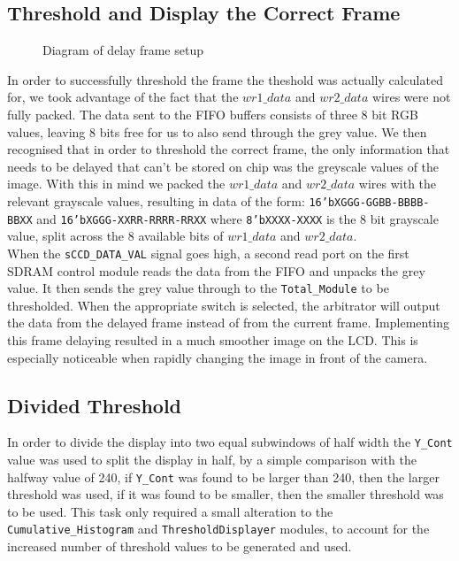 \documentclass[12pt]{article}
\begin{document}
  \subsection{Threshold and Display the Correct Frame}
    \begin{figure}[H]
    \caption{Diagram of delay frame setup}
    \label{fig:hdelyf_ram}
  \end{figure}
  
  In order to successfully threshold the frame the theshold was actually calculated for, we took advantage of the fact that the \(wr1\_data\) and \(wr2\_data\) wires were not fully packed. The data sent to the FIFO buffers consists of three 8 bit RGB values, leaving 8 bits free for us to also send through the grey value. We then recognised that in order to threshold the correct frame, the only information that needs to be delayed that can't be stored on chip was the greyscale values of the image. With this in mind we packed the \(wr1\_data\) and \(wr2\_data\) wires with the relevant grayscale values, resulting in data of the form: \texttt{16'bXGGG-GGBB-BBBB-BBXX} and \texttt{16'bXGGG-XXRR-RRRR-RRXX} where \texttt{8'bXXXX-XXXX} is the 8 bit grayscale value, split across the 8 available bits of \(wr1\_data\) and \(wr2\_data\).\\

  When the \texttt{sCCD\_DATA\_VAL} signal goes high, a second read port on the first SDRAM control module reads the data from the FIFO and unpacks the grey value. It then sends the grey value through to the \texttt{Total\_Module} to be thresholded. When the appropriate switch is selected, the arbitrator will output the data from the delayed frame instead of from the current frame. Implementing this frame delaying resulted in a much smoother image on the LCD. This is especially noticeable when rapidly changing the image in front of the camera.

  \subsection{Divided Threshold}
  In order to divide the display into two equal subwindows of half width the \texttt{Y\_Cont} value was used to split the display in half, by a simple comparison with the halfway value of 240, if \texttt{Y\_Cont} was found to be larger than 240, then the larger threshold was used, if it was found to be smaller, then the smaller threshold was to be used. This task only required a small alteration to the \texttt{Cumulative\_Histogram} and \texttt{ThresholdDisplayer} modules, to account for the increased number of threshold values to be generated and used.
\end{document}
